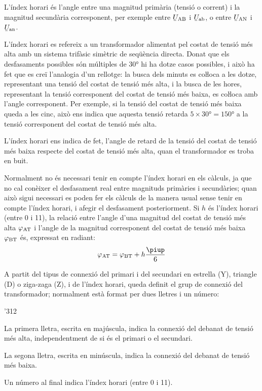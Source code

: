 L'índex horari és l'angle entre una magnitud  primària (tensió o corrent) i la magnitud secundària corresponent, per exemple entre $\cmplx{U}\ped{AB}$ i $\cmplx{U}\ped{ab}$, o entre $\cmplx{U}\ped{AN}$ i $\cmplx{U}\ped{an}$.

L'índex horari es refereix a un transformador alimentat pel costat de tensió més alta  amb un sistema trifàsic simètric de seqüència directa. Donat que els desfasaments possibles són múltiples de \ang{30} hi ha dotze casos possibles, i això ha fet que es creï l'analogia d'un rellotge: la busca dels minuts es coŀloca a les dotze, representant una tensió del costat de tensió més alta, i la busca de les hores, representant la tensió corresponent del costat de tensió més baixa, es coŀloca amb l'angle corresponent. Per exemple, si la tensió del costat de tensió més baixa queda a les cinc, això ens indica que aquesta tensió retarda $5\times \ang{30}= \ang{150}$ a la tensió corresponent del costat de tensió més alta.

L'índex horari ens indica de fet, l'angle de retard de la tensió del costat de tensió més baixa respecte del costat de tensió més alta, quan el transformador es troba en buit.

Normalment no és necessari tenir en compte l'índex horari en els càlculs, ja que no cal conèixer el desfasament real entre magnituds primàries i secundàries; quan això sigui necessari es poden fer els càlculs de la manera usual sense tenir en compte l'índex horari, i afegir el desfasament posteriorment. Si $h$ és l'índex horari (entre 0 i 11), la relació entre l'angle d'una magnitud del costat de tensió més alta $\varphi_\mathrm{AT}$ i l'angle de la magnitud corresponent del costat de tensió més baixa $\varphi_\mathrm{BT}$ és, expressat en radiant:
\begin{equation}
    \varphi\ped{AT} = \varphi\ped{BT} + h\frac{\piup}{6}\label{eq:fi-AT-BT}
\end{equation}


A partit del tipus de connexió del primari i del secundari en estrella (Y), triangle (D) o ziga-zaga (Z), i de l'índex horari, queda definit el grup de connexió del transformador; normalment està format per dues lletres i un número:
\begin{dingautolist}{'312}
   \item La primera lletra, escrita en majúscula, indica la connexió del debanat de tensió més alta, independentment de si és el primari o el secundari.
   \item La segona lletra, escrita en minúscula, indica la connexió del debanat de tensió més baixa.
   \item Un número al final indica l'índex horari (entre 0 i 11).
\end{dingautolist}

